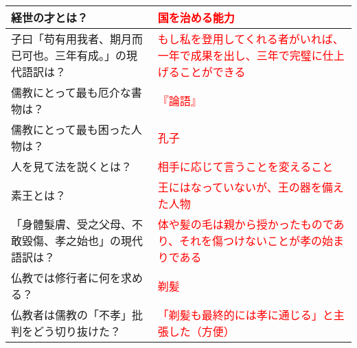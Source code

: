 \documentclass[a4paper,10pt]{article}
\begin{document}
\begin{longtable}{|p{}|p{}|}
経世の才とは？ & \textcolor{red}{国を治める能力} \\ \hline
子曰「苟有用我者、期月而已可也。三年有成。」の現代語訳は？ & \textcolor{red}{もし私を登用してくれる者がいれば、一年で成果を出し、三年で完璧に仕上げることができる} \\ \hline
儒教にとって最も厄介な書物は？ & \textcolor{red}{『論語』} \\ \hline
儒教にとって最も困った人物は？ & \textcolor{red}{孔子} \\ \hline
人を見て法を説くとは？ & \textcolor{red}{相手に応じて言うことを変えること} \\ \hline
素王とは？ & \textcolor{red}{王にはなっていないが、王の器を備えた人物} \\ \hline
「身體髮膚、受之父母、不敢毀傷、孝之始也」の現代語訳は？ & \textcolor{red}{体や髪の毛は親から授かったものであり、それを傷つけないことが孝の始まりである} \\ \hline
仏教では修行者に何を求める？ & \textcolor{red}{剃髪} \\ \hline
仏教者は儒教の「不孝」批判をどう切り抜けた？ & \textcolor{red}{「剃髪も最終的には孝に通じる」と主張した（方便）} \\ \hline
\end{longtable}
\end{document}

